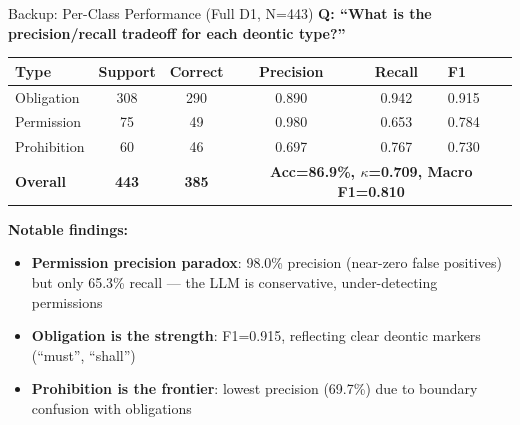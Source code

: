\documentclass[aspectratio=169, 10pt]{beamer}
\begin{document}
\begin{frame}{Backup: Per-Class Performance (Full D1, N=443)}
    \textbf{Q: ``What is the precision/recall tradeoff for each deontic type?''}

    \vspace{0.3cm}
    \begin{table}[]
        \centering
        \begin{tabular}{lccccl}
            \toprule
            \textbf{Type} & \textbf{Support} & \textbf{Correct} & \textbf{Precision} & \textbf{Recall} & \textbf{F1} \\
            \midrule
            Obligation   & 308 & 290 & 0.890 & 0.942 & 0.915 \\
            Permission   & 75  & 49  & 0.980 & 0.653 & 0.784 \\
            Prohibition  & 60  & 46  & 0.697 & 0.767 & 0.730 \\
            \midrule
            \textbf{Overall} & \textbf{443} & \textbf{385} & \multicolumn{3}{c}{\textbf{Acc=86.9\%, $\kappa$=0.709, Macro F1=0.810}} \\
            \bottomrule
        \end{tabular}
    \end{table}

    \vspace{0.3cm}
    \textbf{Notable findings:}
    \begin{itemize}
        \item \textbf{Permission precision paradox}: 98.0\% precision (near-zero false positives) but only 65.3\% recall --- the LLM is conservative, under-detecting permissions
        \item \textbf{Obligation is the strength}: F1=0.915, reflecting clear deontic markers (``must'', ``shall'')
        \item \textbf{Prohibition is the frontier}: lowest precision (69.7\%) due to boundary confusion with obligations
    \end{itemize}
\end{frame}
\end{document}
